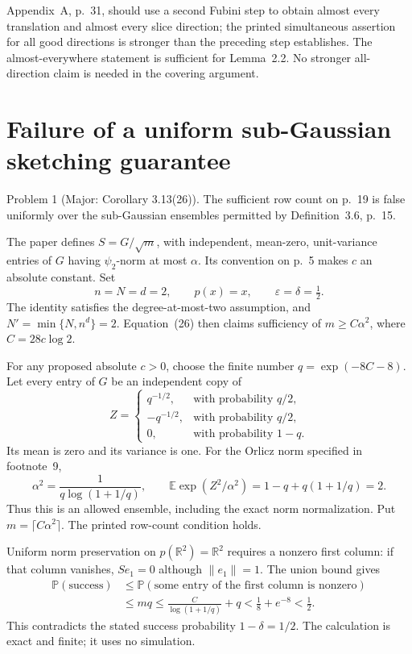 \documentclass[10pt]{article}
\begin{document}
Appendix A, p. 31, should use a second Fubini step to obtain almost every translation and almost every slice direction; the printed simultaneous assertion for all good directions is stronger than the preceding step establishes. The almost-everywhere statement is sufficient for Lemma 2.2. No stronger all-direction claim is needed in the covering argument.\par
\section*{Failure of a uniform sub-Gaussian sketching guarantee}
Problem 1 (Major: Corollary 3.13(26)).  The sufficient row count on p. 19 is false uniformly over the sub-Gaussian ensembles permitted by Definition 3.6, p. 15.\par
The paper defines \(S=G/\sqrt m\), with independent, mean-zero, unit-variance entries of \(G\) having \(\psi_2\)-norm at most \(\alpha\). Its convention on p. 5 makes \(c\) an absolute constant. Set \[n=N=d=2,\qquad p(x)=x,\qquad
 \varepsilon=\delta=\tfrac12.\] The identity satisfies the degree-at-most-two assumption, and \(N'=\min\{N,n^d\}=2\). Equation (26) then claims sufficiency of \(m\ge C\alpha^2\), where \(C=28c\log2\).\par
For any proposed absolute \(c>0\), choose the finite number \(q=\exp(-8C-8)\). Let every entry of \(G\) be an independent copy of \[Z=\begin{cases}
 q^{-1/2},&\text{with probability }q/2,\\
 -q^{-1/2},&\text{with probability }q/2,\\
 0,&\text{with probability }1-q.
 \end{cases}\] Its mean is zero and its variance is one. For the Orlicz norm specified in footnote 9, \[\alpha^2=\frac{1}{q\log(1+1/q)},\qquad
 \mathbb E\exp(Z^2/\alpha^2)
   =1-q+q(1+1/q)=2.\] Thus this is an allowed ensemble, including the exact norm normalization. Put \(m=\lceil C\alpha^2\rceil\). The printed row-count condition holds.\par
Uniform norm preservation on \(p(\mathbb R^2)=\mathbb R^2\) requires a nonzero first column: if that column vanishes, \(Se_1=0\) although \(\|e_1\|=1\). The union bound gives \[\begin{split}
 \mathbb P(\text{success})
 &\le \mathbb P(\text{some entry of the first column is nonzero})\\
 &\le mq
 \le \frac{C}{\log(1+1/q)}+q
 <\tfrac18+e^{-8}<\tfrac12.
 \end{split}\] This contradicts the stated success probability \(1-\delta=1/2\). The calculation is exact and finite; it uses no simulation.\par
\end{document}
